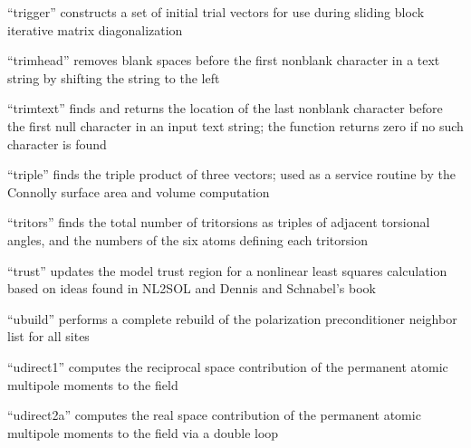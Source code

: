 \documentclass[letterpaper,11pt,english]{sphinxmanual}
\begin{document}
\sphinxAtStartPar
{}

\sphinxAtStartPar
“trigger” constructs a set of initial trial vectors for use during sliding block iterative matrix diagonalization

\sphinxAtStartPar
{}

\sphinxAtStartPar
“trimhead” removes blank spaces before the first non\sphinxhyphen{}blank character in a text string by shifting the string to the left

\sphinxAtStartPar
{}

\sphinxAtStartPar
“trimtext” finds and returns the location of the last non\sphinxhyphen{}blank character before the first null character in an input text string; the function returns zero if no such character is found

\sphinxAtStartPar
{}

\sphinxAtStartPar
“triple” finds the triple product of three vectors; used as a service routine by the Connolly surface area and volume computation

\sphinxAtStartPar
{}

\sphinxAtStartPar
“tritors” finds the total number of tritorsions as triples of adjacent torsional angles, and the numbers of the six atoms defining each tritorsion

\sphinxAtStartPar
{}

\sphinxAtStartPar
“trust” updates the model trust region for a nonlinear least squares calculation based on ideas found in NL2SOL and Dennis and Schnabel’s book

\sphinxAtStartPar
{}

\sphinxAtStartPar
“ubuild” performs a complete rebuild of the polarization preconditioner neighbor list for all sites

\sphinxAtStartPar
{}

\sphinxAtStartPar
“udirect1” computes the reciprocal space contribution of the permanent atomic multipole moments to the field

\sphinxAtStartPar
{}

\sphinxAtStartPar
“udirect2a” computes the real space contribution of the permanent atomic multipole moments to the field via a double loop
\end{document}
